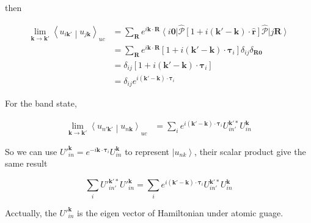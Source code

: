 \noindent
then

\begin{equation}
  \begin{aligned}
    \lim_{\boldsymbol{k} \rightarrow \boldsymbol{k}'} \left\langle u_{i\boldsymbol{k}'} \middle| u_{j\boldsymbol{k}} \right\rangle_{uc} 
    &= \sum_{\boldsymbol{R}} e^{i\boldsymbol{k} \cdot \boldsymbol{R}} 
        \left\langle i\boldsymbol{0} \right| \hat{\mathcal{P}} 
        \left[ 1 + i(\boldsymbol{k}'-\boldsymbol{k}) \cdot \hat{\boldsymbol{r}} \right] 
        \hat{\mathcal{P}} \left| j\boldsymbol{R} \right\rangle \\
    &= \sum_{\boldsymbol{R}} e^{i\boldsymbol{k} \cdot \boldsymbol{R}} 
      \left[ 1 + i(\boldsymbol{k}'-\boldsymbol{k}) \cdot \boldsymbol{\tau}_{i} \right] 
      \delta_{ij}\delta_{\boldsymbol{R}\boldsymbol{0}} \\
    &= \delta_{ij} \left[ 1 + i(\boldsymbol{k}'-\boldsymbol{k}) \cdot \boldsymbol{\tau}_{i} \right] \\
    &= \delta_{ij} e^{i(\boldsymbol{k}'-\boldsymbol{k}) \cdot \boldsymbol{\tau}_{i}} 
  \end{aligned}
\end{equation}


For the band state,

\begin{equation}
  \begin{aligned}
    \lim_{\boldsymbol{k} \rightarrow \boldsymbol{k}'} \left\langle u_{n'\boldsymbol{k}'} \middle| u_{n\boldsymbol{k}} \right\rangle_{uc} 
    &= \sum_{i} e^{i(\boldsymbol{k}'-\boldsymbol{k}) \cdot \boldsymbol{\tau}_{i}} U_{in'}^{\boldsymbol{k}'*} U_{in}^{\boldsymbol{k}}
  \end{aligned}
\end{equation}

\noindent
So we can use ${U'}_{in}^{\boldsymbol{k}} = e^{-i\boldsymbol{k} \cdot \boldsymbol{\tau}_{i}} U_{in}^{\boldsymbol{k}}$ to represent $\left| u_{nk} \right\rangle$,
their scalar product give the same result

\begin{equation}
  \sum_{i} {U'}_{in'}^{\boldsymbol{k}'*} {U'}_{in}^{\boldsymbol{k}} 
    = \sum_{i} e^{i(\boldsymbol{k}'-\boldsymbol{k}) \cdot \boldsymbol{\tau}_{i}} U_{in'}^{\boldsymbol{k}'*} U_{in}^{\boldsymbol{k}}
\end{equation}

\noindent
Acctually, the ${U'}_{in}^{\boldsymbol{k}}$ is the eigen vector of Hamiltonian under atomic guage.


